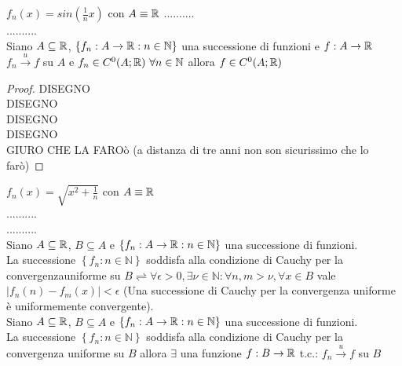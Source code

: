 \example $f_n(x)=sin\left(\frac{1}{n}x\right)$ con $A\equiv \mathbb{R}$
..........\\
..........\\
\proposition
Siano $A\subseteq \mathbb{R}$, $\left\{f_n:A\to \mathbb{R}:n\in\mathbb{N}\right\}$ una successione di funzioni e $f:A\to \mathbb{R}$\\
$f_n\overset{u}{\to}f$ su $A$ e $f_n\in C^0(A; \mathbb{R})\,\,\forall n\in\mathbb{N}$ allora $f\in C^0(A; \mathbb{R})$
\begin{proof}
	DISEGNO\\
	DISEGNO\\
	DISEGNO\\
	DISEGNO\\
	GIURO CHE LA FAROò
	(a distanza di tre anni non son sicurissimo che lo farò)
\end{proof}
\example $f_n(x)=\sqrt{x^2+\frac{1}{n}}$ con $A\equiv \mathbb{R}$\\
..........\\
..........\\
Siano $A\subseteq \mathbb{R}$, $B\subseteq A$ e $\left\{f_n:A\to \mathbb{R}:n\in\mathbb{N}\right\}$ una successione di funzioni.\\
La successione $\left\{f_n:n\in\mathbb{N}\right\}$ soddisfa alla condizione di Cauchy per la convergenzauniforme su $B \rightleftharpoons \forall\epsilon>0, \exists\nu\in\mathbb{N}: \forall n,m>\nu, \forall x \in B$ vale $\left| f_n(n)-f_m(x) \right|<\epsilon$
\proposition
(Una successione di Cauchy per la convergenza uniforme è uniformemente convergente).\\
Siano $A\subseteq \mathbb{R}$, $B\subseteq A$ e $\left\{ f_n:A\to \mathbb{R}:n\in\mathbb{N} \right\}$ una successione di funzioni.\\
La successione $\left\{ f_n:n\in\mathbb{N} \right\}$ soddisfa alla condizione di Cauchy per la convergenza uniforme su $B$ allora $\exists$ una funzione $f:B\to \mathbb{R}$ t.c.: $f_n\overset{u}{\to}f$ su $B$
